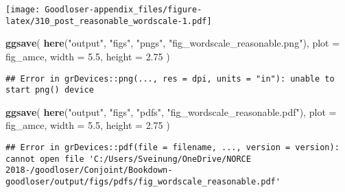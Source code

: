 \documentclass[]{book}
\newenvironment{Shaded}{\begin{snugshade}}{\end{snugshade}}
\newcommand{\KeywordTok}[1]{\textcolor[rgb]{0.13,0.29,0.53}{\textbf{#1}}}
\newcommand{\DataTypeTok}[1]{\textcolor[rgb]{0.13,0.29,0.53}{#1}}
\newcommand{\FloatTok}[1]{\textcolor[rgb]{0.00,0.00,0.81}{#1}}
\newcommand{\StringTok}[1]{\textcolor[rgb]{0.31,0.60,0.02}{#1}}
\newcommand{\NormalTok}[1]{#1}
\begin{document}
\texttt{[image: Goodloser-appendix\_files/figure-latex/310\_post\_reasonable\_wordscale-1.pdf]}

\begin{Shaded}
\begin{Highlighting}[]
\KeywordTok{ggsave}\NormalTok{(}
  \KeywordTok{here}\NormalTok{(}\StringTok{"output"}\NormalTok{, }\StringTok{"figs"}\NormalTok{, }\StringTok{"pngs"}\NormalTok{, }\StringTok{"fig_wordscale_reasonable.png"}\NormalTok{),}
  \DataTypeTok{plot =}\NormalTok{ fig_amce,}
  \DataTypeTok{width =} \FloatTok{5.5}\NormalTok{, }\DataTypeTok{height =} \FloatTok{2.75}
\NormalTok{)}
\end{Highlighting}
\end{Shaded}

\begin{verbatim}
## Error in grDevices::png(..., res = dpi, units = "in"): unable to start png() device
\end{verbatim}

\begin{Shaded}
\begin{Highlighting}[]
\KeywordTok{ggsave}\NormalTok{(}
  \KeywordTok{here}\NormalTok{(}\StringTok{"output"}\NormalTok{, }\StringTok{"figs"}\NormalTok{, }\StringTok{"pdfs"}\NormalTok{, }\StringTok{"fig_wordscale_reasonable.pdf"}\NormalTok{),}
  \DataTypeTok{plot =}\NormalTok{ fig_amce,}
  \DataTypeTok{width =} \FloatTok{5.5}\NormalTok{, }\DataTypeTok{height =} \FloatTok{2.75}
\NormalTok{)}
\end{Highlighting}
\end{Shaded}

\begin{verbatim}
## Error in grDevices::pdf(file = filename, ..., version = version): cannot open file 'C:/Users/Sveinung/OneDrive/NORCE 2018-/goodloser/Conjoint/Bookdown-goodloser/output/figs/pdfs/fig_wordscale_reasonable.pdf'
\end{verbatim}
\end{document}
